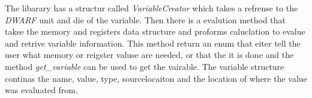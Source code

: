 The libarary has a structur called \emph{VariableCreator} which  takes a refrense to the \emph{DWARF} unit and die of the variable.
Then there is a evalution method that takse the memory and registers data structure and proforms caluclation to evalue and retrive variable information.
This method return an enum that eiter tell the user what memory or reigster valuse are needed, or that the it is done and the method \emph{get\_variable} can be used to get the vairable.
The variable structure continas the name, value, type, sourcelocaiton and the location of where the value was evaluated from.



